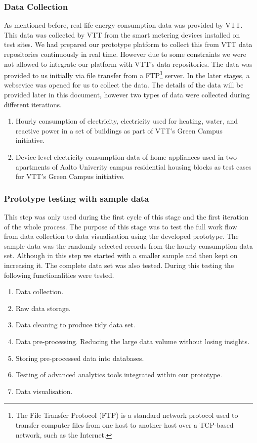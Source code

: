 \subsubsection{Data Collection}
As mentioned before, real life energy consumption data was provided by VTT. This data was collected by VTT from the smart metering devices installed on test sites. We had prepared our prototype platform to collect this from VTT data repositories continuously in real time. However due to some constraints we were not allowed to integrate our platform with VTT's data repositories. The data was provided to us initially via file transfer from a FTP\footnote{The File Transfer Protocol (FTP) is a standard network protocol used to transfer computer files from one host to another host over a TCP-based network, such as the Internet.} server. In the later stages, a websevice was opened for us to collect the data. The details of the data will be provided later in this document, however two types of data were collected during different iterations.
\begin{enumerate}
\item Hourly consumption of electricity, electricity used for heating, water, and reactive power in a set of buildings as part of VTT's Green Campus initiative.
\item Device level electricity consumption data of home appliances used in two apartments of Aalto Univerity campus residential housing blocks as test cases for VTT's Green Campus initiative.

\end{enumerate}
\subsubsection{Prototype testing with sample data}\label{prototype}
This step was only used during the first cycle of this stage and the first iteration of the whole process. The purpose of this stage was to test the full work flow from data collection to data visualisation using the developed prototype. The sample data was the randomly selected records from the hourly consumption data set. Although in this step we started with a smaller sample and then kept on increasing it. The complete data set was also tested. During this testing the following functionalities were tested.
\begin{enumerate}
\item Data collection.
\item Raw data storage.
\item Data cleaning to produce tidy data set.
\item Data pre-processing. Reducing the large data volume without losing insights. 
\item Storing pre-processed data into databases.
\item Testing of advanced analytics tools integrated within our prototype.
\item Data visualisation.  
\end{enumerate}
